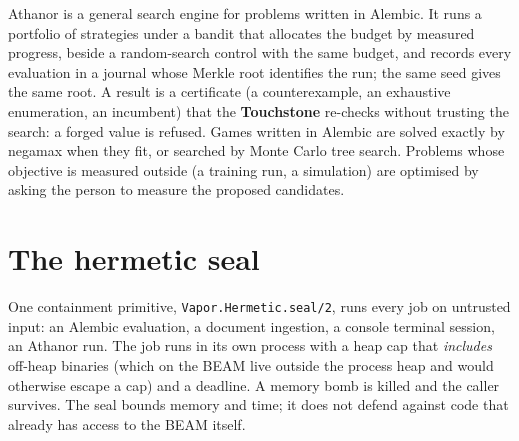 Athanor is a general search engine for problems written in Alembic. It runs a portfolio of strategies
under a bandit that allocates the budget by measured progress, beside a random-search control with the
same budget, and records every evaluation in a journal whose Merkle root identifies the run; the same seed
gives the same root. A result is a certificate (a counterexample, an exhaustive enumeration, an
incumbent) that the \textbf{Touchstone} re-checks without trusting the search: a forged value is refused.
Games written in Alembic are solved exactly by negamax when they fit, or searched by Monte Carlo tree
search. Problems whose objective is measured outside (a training run, a simulation) are optimised by
asking the person to measure the proposed candidates.

\section{The hermetic seal}

One containment primitive, \texttt{Vapor.Hermetic.seal/2}, runs every job on untrusted input: an
Alembic evaluation, a document ingestion, a console terminal session, an Athanor run. The job runs in
its own process with a heap cap that \emph{includes} off-heap binaries (which on the BEAM live outside
the process heap and would otherwise escape a cap) and a deadline. A memory bomb is killed and the
caller survives. The seal bounds memory and time; it does not defend against code that already has access
to the BEAM itself.
